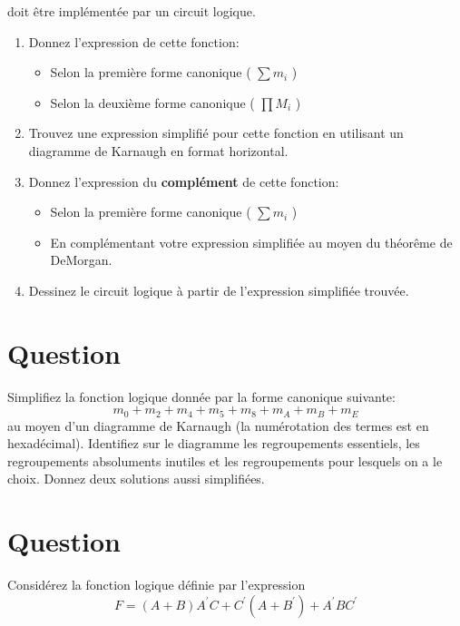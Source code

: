 \documentclass[letter, oneside]{book}
\begin{document}
doit être implémentée par un circuit logique.

\begin{enumerate}
\item Donnez l'expression de cette fonction:

\begin{itemize}
\item Selon la première forme canonique ( \(\sum m_i\) )

\item Selon la deuxième forme canonique ( \(\prod M_i\) )
\end{itemize}

\item Trouvez une expression simplifié pour cette fonction en utilisant
un diagramme de Karnaugh en format horizontal.

\item Donnez l'expression du \textbf{complément} de cette fonction:

\begin{itemize}
\item Selon la première forme canonique ( \(\sum m_i\) )

\item En complémentant votre expression simplifiée au moyen du
théorême de DeMorgan.
\end{itemize}

\item Dessinez le circuit logique à partir de l'expression simplifiée
trouvée.
\end{enumerate}

\section*{Question}
\label{sec:org5bde599}
Simplifiez la fonction logique donnée par la forme canonique
  suivante:
  $$
    m_0 + m_2 + m_4 + m_5 + m_8 + m_A + m_B + m_E
    $$
  au
  moyen d'un diagramme de Karnaugh (la numérotation des termes est en
  hexadécimal). Identifiez sur le diagramme les regroupements
  essentiels, les regroupements absoluments inutiles et les
  regroupements pour lesquels on a le choix. Donnez deux solutions
  aussi simplifiées.

\section*{Question}
\label{sec:org3903003}
Considérez la fonction logique définie par l'expression
  $$
    F =
      (A + B) A^{\prime} C + C^{\prime}(A+B^{\prime}) + A^{\prime}B
      C^{\prime}
    $$
\end{document}
